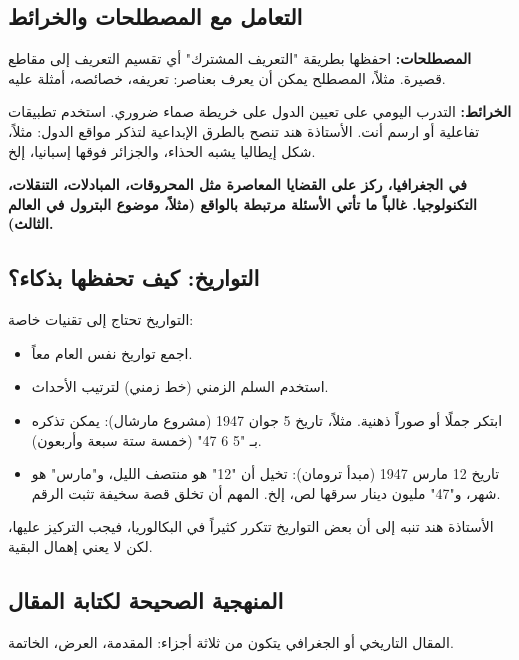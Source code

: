 \documentclass[12pt,a4paper]{book}
\newcommand{\importantAr}[1]{%
	\begin{important}
		\bfseries #1
	\end{important}
}
\begin{document}
	\subsection{التعامل مع المصطلحات والخرائط}
	
	\textbf{المصطلحات:} احفظها بطريقة "التعريف المشترك" أي تقسيم التعريف إلى مقاطع قصيرة. مثلاً، المصطلح يمكن أن يعرف بعناصر: تعريفه، خصائصه، أمثلة عليه.
	
	\textbf{الخرائط:} التدرب اليومي على تعيين الدول على خريطة صماء ضروري. استخدم تطبيقات تفاعلية أو ارسم أنت. الأستاذة هند تنصح بالطرق الإبداعية لتذكر مواقع الدول: مثلاً، شكل إيطاليا يشبه الحذاء، والجزائر فوقها إسبانيا، إلخ.
	
	\importantAr{في الجغرافيا، ركز على القضايا المعاصرة مثل المحروقات، \newline المبادلات، التنقلات، التكنولوجيا. غالباً ما تأتي الأسئلة مرتبطة بالواقع (مثلاً، موضوع البترول في العالم الثالث).}
	
	\subsection{التواريخ: كيف تحفظها بذكاء؟}
	
	التواريخ تحتاج إلى تقنيات خاصة:
	
	\begin{itemize}
		\item اجمع تواريخ نفس العام معاً.
		\item استخدم السلم الزمني (خط زمني) لترتيب الأحداث.
		\item ابتكر جملًا أو صوراً ذهنية. مثلاً، تاريخ 5 جوان 1947 (مشروع مارشال): يمكن تذكره بـ "5 6 47" (خمسة ستة سبعة وأربعون).
		\item تاريخ 12 مارس 1947 (مبدأ ترومان): تخيل أن "12" هو منتصف الليل، و"مارس" هو شهر، و"47" مليون دينار سرقها لص، إلخ. المهم أن تخلق قصة سخيفة تثبت الرقم.
	\end{itemize}
	
	الأستاذة هند تنبه إلى أن بعض التواريخ تتكرر كثيراً في البكالوريا، فيجب التركيز عليها، لكن لا يعني إهمال البقية.
	
	\subsection{المنهجية الصحيحة لكتابة المقال}
	
	المقال التاريخي أو الجغرافي يتكون من ثلاثة أجزاء: المقدمة، العرض، الخاتمة.
	
\end{document}
